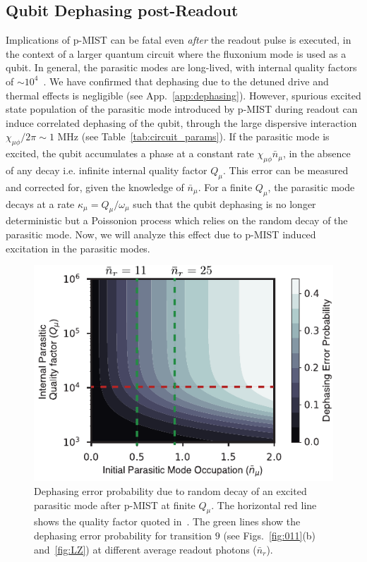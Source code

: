 \documentclass[%
reprint,
superscriptaddress,
 amsmath,amssymb,
 aps,
 prx,
longbibliography,
floatfix,
]{revtex4-2}
\begin{document}
\subsection{Qubit Dephasing post-Readout} 
Implications of p-MIST can be fatal even \textit{after} the readout pulse is executed, in the context of a larger quantum circuit where the fluxonium mode is used as a qubit. In general, the parasitic modes are long-lived, with internal quality factors of $\sim 10^{4}$~\cite{masluk_microwave_2012, masluk2013reducing}. We have confirmed that dephasing due to the detuned drive and thermal effects is negligible (see App.~\ref{app:dephasing}). However, spurious excited state population of the parasitic mode introduced by p-MIST during readout can induce correlated dephasing of the qubit, through the large dispersive interaction $\chi_{\mu \phi}/2\pi \sim 1$ MHz (see Table~\ref{tab:circuit_params}). If the parasitic mode is excited, the qubit accumulates a phase at a constant rate $\chi_{\mu\phi} \bar n_\mu$, in the absence of any decay i.e. infinite internal quality factor $Q_\mu$. This error can be measured and corrected for, given the knowledge of $\bar n_\mu$. For a finite $Q_\mu$, the parasitic mode decays at a rate $\kappa_\mu=Q_\mu/\omega_\mu$ such that the qubit dephasing is no longer deterministic but a Poissonion process which relies on the random decay of the parasitic mode. Now, we will analyze this effect due to p-MIST induced excitation in the parasitic modes.


\begin{figure}[htb]
    \centering
    \includegraphics[width=\linewidth]{Figures/dephasing.pdf}
    \caption{Dephasing error probability due to random decay of an excited parasitic mode after p-MIST at finite $Q_\mu$. The horizontal red line shows the quality factor quoted in~\cite{masluk_microwave_2012}. The green lines show the dephasing error probability for transition $9$ (see Figs.~\ref{fig:011}(b) and~\ref{fig:LZ}) at different average readout photons ($\bar n_r$).}
    \label{fig:dephasing}
\end{figure}
\end{document}
